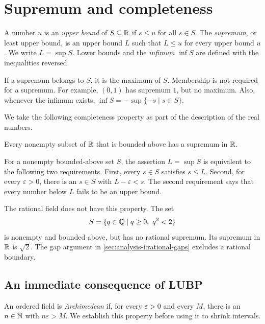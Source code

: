 \section{Supremum and completeness}
\label{sec:analysis-i:supremum}

\begin{definition}
  A number $u$ is an \emph{upper bound} of $S\subseteq\mathbb{R}$ if $s\leq u$
  for all $s\in S$. The \emph{supremum}, or least upper bound, is an upper
  bound $L$ such that $L\leq u$ for every upper bound $u$. We write
  $L=\sup S$. Lower bounds and the \emph{infimum} $\inf S$ are defined
  with the inequalities reversed.
\end{definition}
If a supremum belongs to $S$, it is the maximum of $S$. Membership is not
required for a supremum. For example, $(0,1)$ has supremum $1$, but no
maximum. Also, whenever the infimum exists,
$\inf S=-\sup\{-s\mid s\in S\}$.

We take the following completeness property as part of the description of
the real numbers.

\begin{property}
  \label{thm:analysis-i:lubp}
  Every nonempty subset of
  $\mathbb{R}$ that is bounded above has a supremum in $\mathbb{R}$.
\end{property}
For a nonempty bounded-above set $S$, the assertion $L=\sup S$ is equivalent
to the following two requirements. First, every $s\in S$ satisfies $s\leq L$.
Second, for every $\varepsilon>0$, there is an $s\in S$ with
$L-\varepsilon<s$. The second requirement says that every number below
$L$ fails to be an upper bound.

The rational field does not have this property. The set
\[
  S=\{q\in\mathbb{Q}\mid q\geq0,\ q^2<2\}
\]
is nonempty and bounded above, but has no rational supremum. Its supremum
in $\mathbb{R}$ is $\sqrt{2}$. The gap argument in
\autoref{sec:analysis-i:rational-gaps} excludes a rational boundary.

\subsection{An immediate consequence of LUBP}
An ordered field is \emph{Archimedean} if, for every $\varepsilon>0$ and
every $M$, there is an $n\in\mathbb{N}$ with $n\varepsilon>M$.
We establish this property before using it to shrink intervals.


